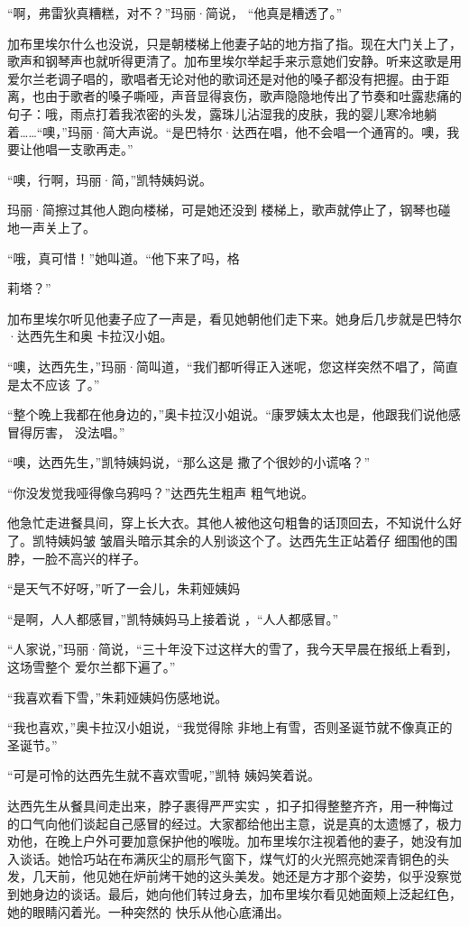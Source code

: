 \documentclass{article}
\begin{document}
\newpage

“啊，弗雷狄真糟糕，对不？”玛丽·简说，
“他真是糟透了。” 

加布里埃尔什么也没说，只是朝楼梯上他妻子站的地方指了指。现在大门关上了，歌声和钢琴声也就听得更清了。加布里埃尔举起手来示意她们安静。听来这歌是用爱尔兰老调子唱的，歌唱者无论对他的歌词还是对他的嗓子都没有把握。由于距离，也由于歌者的嗓子嘶哑，声音显得哀伤，歌声隐隐地传出了节奏和吐露悲痛的句子：哦，雨点打着我浓密的头发，露珠儿沾湿我的皮肤，我的婴儿寒冷地躺着……“噢，”玛丽·简大声说。“是巴特尔·达西在唱，他不会唱一个通宵的。噢，我要让他唱一支歌再走。”


“噢，行啊，玛丽·简，”凯特姨妈说。 

玛丽·简擦过其他人跑向楼梯，可是她还没到
楼梯上，歌声就停止了，钢琴也碰地一声关上了。 

“哦，真可惜！”她叫道。“他下来了吗，格

\newpage
莉塔？” 

加布里埃尔听见他妻子应了一声是，看见她朝他们走下来。她身后几步就是巴特尔·达西先生和奥
卡拉汉小姐。 

“噢，达西先生，”玛丽·简叫道，“我们都听得正入迷呢，您这样突然不唱了，简直是太不应该
了。” 

“整个晚上我都在他身边的，”奥卡拉汉小姐说。“康罗姨太太也是，他跟我们说他感冒得厉害，
没法唱。” 

“噢，达西先生，”凯特姨妈说，“那么这是
撒了个很妙的小谎咯？” 

“你没发觉我哑得像乌鸦吗？”达西先生粗声
粗气地说。 

他急忙走进餐具间，穿上长大衣。其他人被他这句粗鲁的话顶回去，不知说什么好了。凯特姨妈皱
\newpage
皱眉头暗示其余的人别谈这个了。达西先生正站着仔
细围他的围脖，一脸不高兴的样子。 

“是天气不好呀，”听了一会儿，朱莉娅姨妈

“是啊，人人都感冒，”凯特姨妈马上接着说
，“人人都感冒。” 

“人家说，”玛丽·简说，“三十年没下过这样大的雪了，我今天早晨在报纸上看到，这场雪整个
爱尔兰都下遍了。” 


“我喜欢看下雪，”朱莉娅姨妈伤感地说。 

“我也喜欢，”奥卡拉汉小姐说，“我觉得除
非地上有雪，否则圣诞节就不像真正的圣诞节。” 

“可是可怜的达西先生就不喜欢雪呢，”凯特
姨妈笑着说。 

达西先生从餐具间走出来，脖子裹得严严实实
\newpage
，扣子扣得整整齐齐，用一种悔过的口气向他们谈起自己感冒的经过。大家都给他出主意，说是真的太遗憾了，极力劝他，在晚上户外可要加意保护他的喉咙。加布里埃尔注视着他的妻子，她没有加入谈话。她恰巧站在布满灰尘的扇形气窗下，煤气灯的火光照亮她深青铜色的头发，几天前，他见她在炉前烤干她的这头美发。她还是方才那个姿势，似乎没察觉到她身边的谈话。最后，她向他们转过身去，加布里埃尔看见她面颊上泛起红色，她的眼睛闪着光。一种突然的
快乐从他心底涌出。 
\end{document}
